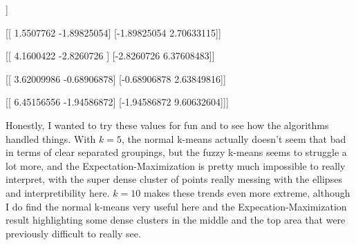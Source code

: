 \documentclass{article}
\begin{document}
{\begin{spverbatim}
 [[ 0.64366063  0.2771667 ]
  [ 0.2771667   0.30519448]]

 [[ 1.5507762  -1.89825054]
  [-1.89825054  2.70633115]]

 [[ 4.1600422  -2.8260726 ]
  [-2.8260726   6.37608483]]

 [[ 3.62009986 -0.68906878]
  [-0.68906878  2.63849816]]

 [[ 6.45156556 -1.94586872]
  [-1.94586872  9.60632604]]]
\end{spverbatim}
Honestly, I wanted to try these values for fun and to see how the algorithms handled things. With \(k=5\), the normal k-means actually doesn't seem that bad in terms of clear separated groupings, but the fuzzy k-means seems to struggle a lot more, and the Expectation-Maximization is pretty much impossible to really interpret, with the super dense cluster of points really messing with the ellipses and interpretibility here. \(k=10\) makes these trends even more extreme, although I do find the normal k-means very useful here and the Expecation-Maximization result highlighting some dense clusters in the middle and the top area that were previously difficult to really see.

}
\end{document}
